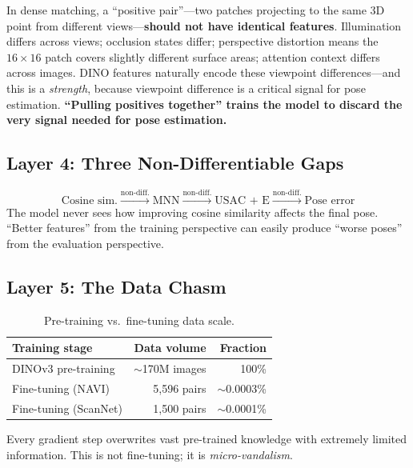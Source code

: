 \documentclass[11pt,a4paper]{article}
\begin{document}
In dense matching, a ``positive pair''---two patches projecting to the same 3D point from different views---\textbf{should not have identical features}. Illumination differs across views; occlusion states differ; perspective distortion means the $16\!\times\!16$ patch covers slightly different surface areas; attention context differs across images. DINO features naturally encode these viewpoint differences---and this is a \emph{strength}, because viewpoint difference is a critical signal for pose estimation. \textbf{``Pulling positives together'' trains the model to discard the very signal needed for pose estimation.}

\subsection{Layer 4: Three Non-Differentiable Gaps}

\begin{equation}
\text{Cosine sim.} \xrightarrow{\text{non-diff.}} \text{MNN} \xrightarrow{\text{non-diff.}} \text{USAC + E} \xrightarrow{\text{non-diff.}} \text{Pose error}
\end{equation}
The model never sees how improving cosine similarity affects the final pose. ``Better features'' from the training perspective can easily produce ``worse poses'' from the evaluation perspective.

\subsection{Layer 5: The Data Chasm}

\begin{table}[t]
\centering\small
\caption{Pre-training vs.\ fine-tuning data scale.}
\label{tab:data_gap}
\begin{tabular}{@{}lrr@{}}
\toprule
\textbf{Training stage} & \textbf{Data volume} & \textbf{Fraction} \\
\midrule
DINOv3 pre-training & $\sim$170M images & 100\% \\
Fine-tuning (NAVI)  & 5,596 pairs      & $\sim$0.0003\% \\
Fine-tuning (ScanNet) & 1,500 pairs    & $\sim$0.0001\% \\
\bottomrule
\end{tabular}
\end{table}
Every gradient step overwrites vast pre-trained knowledge with extremely limited information. This is not fine-tuning; it is \emph{micro-vandalism}.
\end{document}
